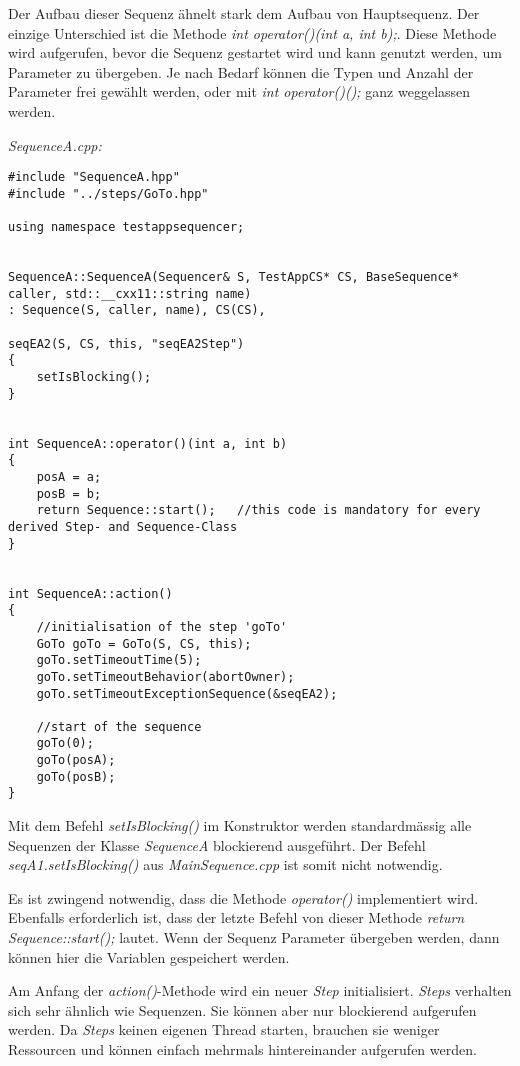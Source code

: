 Der Aufbau dieser Sequenz ähnelt stark dem Aufbau von Hauptsequenz.
Der einzige Unterschied ist die Methode \textit{int operator()(int a, int b);}.
Diese Methode wird aufgerufen, bevor die Sequenz gestartet wird und kann genutzt werden, um Parameter zu übergeben.
Je nach Bedarf können die Typen und Anzahl der Parameter frei gewählt werden, oder mit \textit{int operator()();} ganz weggelassen werden.


\textit{SequenceA.cpp:}\
\begin{lstlisting}
#include "SequenceA.hpp"
#include "../steps/GoTo.hpp"

using namespace testappsequencer;


SequenceA::SequenceA(Sequencer& S, TestAppCS* CS, BaseSequence* caller, std::__cxx11::string name)
: Sequence(S, caller, name), CS(CS),

seqEA2(S, CS, this, "seqEA2Step")
{
	setIsBlocking();
}


int SequenceA::operator()(int a, int b)
{
	posA = a;
	posB = b;
	return Sequence::start();	//this code is mandatory for every derived Step- and Sequence-Class
}


int SequenceA::action()
{
	//initialisation of the step 'goTo'
	GoTo goTo = GoTo(S, CS, this);
	goTo.setTimeoutTime(5);
 	goTo.setTimeoutBehavior(abortOwner);
	goTo.setTimeoutExceptionSequence(&seqEA2);
	
	//start of the sequence
	goTo(0);
	goTo(posA);
	goTo(posB);
}

\end{lstlisting}

Mit dem Befehl \textit{setIsBlocking()} im Konstruktor werden standardmässig alle Sequenzen der Klasse \textit{SequenceA} blockierend ausgeführt.
Der Befehl \textit{seqA1.setIsBlocking()} aus \textit{MainSequence.cpp} ist somit nicht notwendig.

Es ist zwingend notwendig, dass die Methode \textit{operator()} implementiert wird.
Ebenfalls erforderlich ist, dass der letzte Befehl von dieser Methode \textit{return Sequence::start();}  lautet.
Wenn der Sequenz Parameter übergeben werden, dann können hier die Variablen gespeichert werden.

Am Anfang der \textit{action()}-Methode wird ein neuer \textit{Step} initialisiert.
\textit{Steps} verhalten sich sehr ähnlich wie Sequenzen.
Sie können aber nur blockierend aufgerufen werden.
Da \textit{Steps} keinen eigenen Thread starten, brauchen sie weniger Ressourcen und können einfach mehrmals hintereinander aufgerufen werden.



